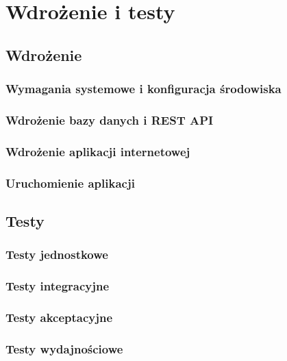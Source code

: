 \chapter{Wdrożenie i testy}
\section{Wdrożenie}
\subsection{Wymagania systemowe i konfiguracja środowiska}
\subsection{Wdrożenie bazy danych i REST API}
\subsection{Wdrożenie aplikacji internetowej}
\subsection{Uruchomienie aplikacji}
\section{Testy}
\subsection{Testy jednostkowe}
\subsection{Testy integracyjne}
\subsection{Testy akceptacyjne}
\subsection{Testy wydajnościowe}